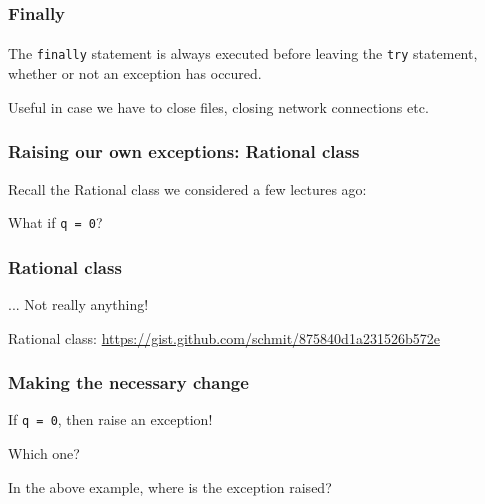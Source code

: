 
\begin{frame}\frametitle{Finally}
    \framesubtitle{}

    The \texttt{finally} statement is always executed before leaving the
    \texttt{try} statement, whether or not an exception has occured.


    \pause

    Useful in case we have to close files, closing network connections etc.

\end{frame}

\begin{frame}\frametitle{Raising our own exceptions: Rational class}

    Recall the Rational class we considered a few lectures ago:


    What if \texttt{q = 0}?

\end{frame}

\begin{frame}\frametitle{Rational class}


... Not really anything!

\vfill
\scriptsize{Rational class: \url{https://gist.github.com/schmit/875840d1a231526b572e}}

\end{frame}

\begin{frame}\frametitle{Making the necessary change}

If \texttt{q = 0}, then raise an exception!

Which one?

\pause


In the above example, where is the exception raised?

\end{frame}

